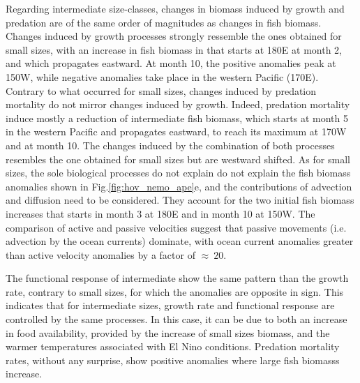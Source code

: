 Regarding intermediate size-classes, changes in biomass induced by growth and predation are of the same order of magnitudes as changes in fish biomass. Changes induced by growth processes strongly ressemble the ones obtained for small sizes, with an increase in fish biomass in that starts at 180\degree{}E at month 2, and which propagates eastward. At month 10, the positive anomalies peak at 150\degree{}W, while negative anomalies take place in the western Pacific (170\degre{}E). Contrary to what occurred for small sizes, changes induced by predation mortality do not mirror changes induced by growth. Indeed, predation mortality induce mostly a reduction of intermediate fish biomass, which starts at month 5 in the western Pacific and propagates eastward, to reach its maximum at 170\degree{}W and at month 10. The changes induced by the combination of both processes resembles the one obtained for small sizes but are westward shifted. As for small sizes, the sole biological processes do not explain do not explain the fish biomass anomalies shown in Fig.\ref{fig:hov_nemo_ape}e, and the contributions of advection and diffusion need to be considered. They account for the two initial fish biomass increases that starts in month 3 at 180\degree{}E and in month 10 at 150\degree{}W. The comparison of active and passive velocities suggest that passive movements (i.e. advection by the ocean currents) dominate, with ocean current anomalies greater than active velocity anomalies by a factor of $\approx\ 20$.

The functional response of intermediate show the same pattern than the growth rate, contrary to small sizes, for which the anomalies are opposite in sign. This indicates that for intermediate sizes, growth rate and functional response are controlled by the same processes. In this case, it can be due to both an increase in food availability, provided by the increase of small sizes biomass, and the warmer temperatures associated with El Nino conditions. Predation mortality rates, without any surprise, show positive anomalies where large fish biomasss increase.


